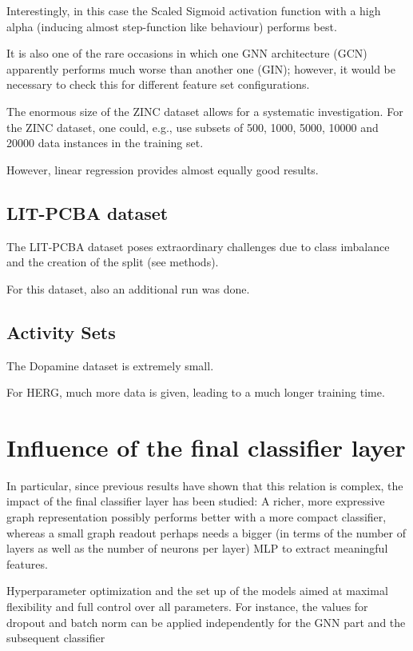 Interestingly, in this case the Scaled Sigmoid activation function with a high alpha (inducing almost step-function like behaviour) performs best.



It is also one of the rare occasions in which one GNN architecture (GCN) apparently performs much worse than another one (GIN); however, it would be necessary to check this for different feature set configurations.




The enormous size of the ZINC dataset allows for a systematic investigation.
For the ZINC dataset, one could, e.g., use subsets of
500, 1000, 5000, 10000 and 20000 data instances in the training set.

However, linear regression provides almost equally good results.


\subsection{LIT-PCBA dataset}

The LIT-PCBA dataset poses extraordinary challenges due to class imbalance and the creation of the split (see methods).


For this dataset, also an additional run was done.

\subsection{Activity Sets}

The Dopamine dataset is extremely small.

For HERG, much more data is given, leading to a much longer training time.


\section{Influence of the final classifier layer}

In particular, since previous results have shown that this relation is complex, the impact of the final classifier layer has been studied: A richer, more expressive graph representation possibly performs better with a more compact classifier, whereas a small graph readout perhaps needs a bigger (in terms of the number of layers as well as the number of neurons per layer) MLP to extract meaningful features.





Hyperparameter optimization and the set up of the models aimed at maximal flexibility and full control over all parameters. For instance, the values for dropout and batch norm can be applied independently for the GNN part and the subsequent classifier


